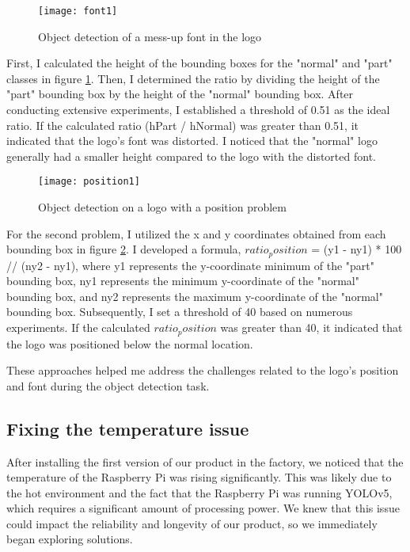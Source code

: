 \begin{figure}[htbp]
    \centering
    
    \begin{minipage}{1\textwidth}
        \centering
        \texttt{[image: font1]}
        \caption{Object detection of a mess-up font in the logo}
        \label{fig:image4}
    \end{minipage}
\end{figure}
\FloatBarrier 
 First, I calculated the height of the bounding boxes for the "normal" and "part" classes in figure \ref{fig:image4}. Then, I determined the ratio by dividing the height of the "part" bounding box by the height of the "normal" bounding box. After conducting extensive experiments, I established a threshold of 0.51 as the ideal ratio. If the calculated ratio (hPart / hNormal) was greater than 0.51, it indicated that the logo's font was distorted. I noticed that the "normal" logo generally had a smaller height compared to the logo with the distorted font.
\FloatBarrier
\begin{figure}[htbp]
    \centering
    
    \begin{minipage}{1\textwidth}
        \centering
        \texttt{[image: position1]}
        \caption{Object detection on a logo with a position problem}
        \label{fig:image5}
    \end{minipage}
\end{figure}
\FloatBarrier
For the second problem, I utilized the x and y coordinates obtained from each bounding box  in figure \ref{fig:image5}. I developed a formula, $ratio_position$ = (y1 - ny1) * 100 // (ny2 - ny1), where y1 represents the y-coordinate minimum of the "part" bounding box, ny1 represents the minimum y-coordinate of the "normal" bounding box, and ny2 represents the maximum y-coordinate of the "normal" bounding box. Subsequently, I set a threshold of 40 based on numerous experiments. If the calculated $ratio_position$ was greater than 40, it indicated that the logo was positioned below the normal location.

These approaches helped me address the challenges related to the logo's position and font during the object detection task.
\subsection{Fixing the temperature issue}
After installing the first version of our product in the factory, we noticed that the temperature of the Raspberry Pi was rising significantly. This was likely due to the hot environment and the fact that the Raspberry Pi was running YOLOv5, which requires a significant amount of processing power. We knew that this issue could impact the reliability and longevity of our product, so we immediately began exploring solutions.

